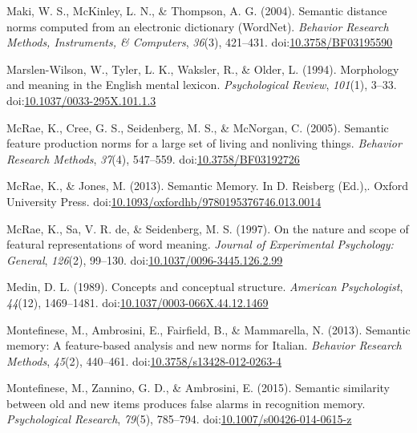 \documentclass[english,,man]{apa6}
\theoremstyle{definition}
\theoremstyle{definition}
\theoremstyle{definition}
\theoremstyle{remark}
\begin{document}
\leavevmode\hypertarget{ref-Maki2004}{}%
Maki, W. S., McKinley, L. N., \& Thompson, A. G. (2004). Semantic
distance norms computed from an electronic dictionary (WordNet).
\emph{Behavior Research Methods, Instruments, \& Computers},
\emph{36}(3), 421--431.
doi:\href{https://doi.org/10.3758/BF03195590}{10.3758/BF03195590}

\leavevmode\hypertarget{ref-Marslen-Wilson1994}{}%
Marslen-Wilson, W., Tyler, L. K., Waksler, R., \& Older, L. (1994).
Morphology and meaning in the English mental lexicon.
\emph{Psychological Review}, \emph{101}(1), 3--33.
doi:\href{https://doi.org/10.1037/0033-295X.101.1.3}{10.1037/0033-295X.101.1.3}

\leavevmode\hypertarget{ref-McRae2005}{}%
McRae, K., Cree, G. S., Seidenberg, M. S., \& McNorgan, C. (2005).
Semantic feature production norms for a large set of living and
nonliving things. \emph{Behavior Research Methods}, \emph{37}(4),
547--559.
doi:\href{https://doi.org/10.3758/BF03192726}{10.3758/BF03192726}

\leavevmode\hypertarget{ref-McRae2013}{}%
McRae, K., \& Jones, M. (2013). Semantic Memory. In D. Reisberg (Ed.),.
Oxford University Press.
doi:\href{https://doi.org/10.1093/oxfordhb/9780195376746.013.0014}{10.1093/oxfordhb/9780195376746.013.0014}

\leavevmode\hypertarget{ref-McRae1997}{}%
McRae, K., Sa, V. R. de, \& Seidenberg, M. S. (1997). On the nature and
scope of featural representations of word meaning. \emph{Journal of
Experimental Psychology: General}, \emph{126}(2), 99--130.
doi:\href{https://doi.org/10.1037/0096-3445.126.2.99}{10.1037/0096-3445.126.2.99}

\leavevmode\hypertarget{ref-Medin1989}{}%
Medin, D. L. (1989). Concepts and conceptual structure. \emph{American
Psychologist}, \emph{44}(12), 1469--1481.
doi:\href{https://doi.org/10.1037/0003-066X.44.12.1469}{10.1037/0003-066X.44.12.1469}

\leavevmode\hypertarget{ref-Montefinese2013}{}%
Montefinese, M., Ambrosini, E., Fairfield, B., \& Mammarella, N. (2013).
Semantic memory: A feature-based analysis and new norms for Italian.
\emph{Behavior Research Methods}, \emph{45}(2), 440--461.
doi:\href{https://doi.org/10.3758/s13428-012-0263-4}{10.3758/s13428-012-0263-4}

\leavevmode\hypertarget{ref-Montefinese2015}{}%
Montefinese, M., Zannino, G. D., \& Ambrosini, E. (2015). Semantic
similarity between old and new items produces false alarms in
recognition memory. \emph{Psychological Research}, \emph{79}(5),
785--794.
doi:\href{https://doi.org/10.1007/s00426-014-0615-z}{10.1007/s00426-014-0615-z}
\end{document}
